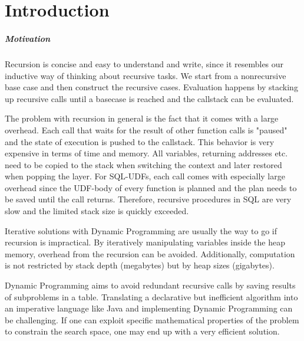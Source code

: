 \chapter{Introduction}\label{Introduction}


\paragraph*{Motivation} Recursion is concise and easy to understand and write, since it resembles our inductive way of thinking about recursive tasks. We start from a nonrecursive base case and then construct the recursive cases. Evaluation happens by stacking up recursive calls until a basecase is reached and the callstack can be evaluated.

The problem with recursion in general is the fact that it comes with a large overhead. Each call that waits for the result of other function calls is "paused" and the state of execution is pushed to the callstack. This behavior is very expensive in terms of time and memory. All variables, returning addresses etc. need to be copied to the stack when switching the context and later restored when popping the layer. For SQL-UDFs, each call comes with especially large overhead since the UDF-body of every function is planned and the plan needs to be saved until the call returns. Therefore, recursive procedures in SQL are very slow and the limited stack size is quickly exceeded.

Iterative solutions with Dynamic Programming are usually the way to go if recursion is impractical. By iteratively manipulating variables inside the heap memory, overhead from the recursion can be avoided. Additionally, computation is not restricted by stack depth (megabytes) but by heap sizes (gigabytes).

Dynamic Programming \cite{DP_Bellman} aims to avoid redundant recursive calls by saving results of subproblems in a table. Translating a declarative but inefficient algorithm into an imperative language like Java and implementing Dynamic Programming can be challenging. If one can exploit specific mathematical properties of the problem to constrain the search space, one may end up with a very efficient solution.

